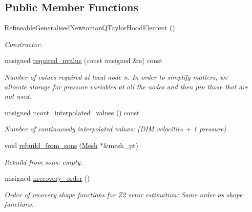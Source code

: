 \subsection*{Public Member Functions}
\begin{DoxyCompactItemize}
\item 
\hyperlink{classoomph_1_1RefineableGeneralisedNewtonianQTaylorHoodElement_a9f535663f1439f9da8be4dc0e888da07}{Refineable\+Generalised\+Newtonian\+Q\+Taylor\+Hood\+Element} ()
\begin{DoxyCompactList}\small\item\em Constructor. \end{DoxyCompactList}\item 
unsigned \hyperlink{classoomph_1_1RefineableGeneralisedNewtonianQTaylorHoodElement_a9b84c1c9ffa3262c0bb3c4762eebb3f5}{required\+\_\+nvalue} (const unsigned \&n) const
\begin{DoxyCompactList}\small\item\em Number of values required at local node n. In order to simplify matters, we allocate storage for pressure variables at all the nodes and then pin those that are not used. \end{DoxyCompactList}\item 
unsigned \hyperlink{classoomph_1_1RefineableGeneralisedNewtonianQTaylorHoodElement_a010adb919ba9b8850e5f586467777052}{ncont\+\_\+interpolated\+\_\+values} () const
\begin{DoxyCompactList}\small\item\em Number of continuously interpolated values\+: (D\+IM velocities + 1 pressure) \end{DoxyCompactList}\item 
void \hyperlink{classoomph_1_1RefineableGeneralisedNewtonianQTaylorHoodElement_a356391ebd65c493cc40bf1df0749047a}{rebuild\+\_\+from\+\_\+sons} (\hyperlink{classoomph_1_1Mesh}{Mesh} $\ast$\&mesh\+\_\+pt)
\begin{DoxyCompactList}\small\item\em Rebuild from sons\+: empty. \end{DoxyCompactList}\item 
unsigned \hyperlink{classoomph_1_1RefineableGeneralisedNewtonianQTaylorHoodElement_ab162e59c24eff8cce5e43ce30c537efc}{nrecovery\+\_\+order} ()
\begin{DoxyCompactList}\small\item\em Order of recovery shape functions for Z2 error estimation\+: Same order as shape functions. \end{DoxyCompactList}\item 

\end{DoxyCompactItemize}
